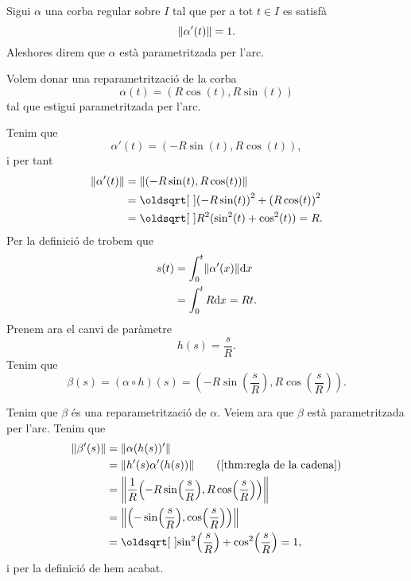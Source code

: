 \documentclass[../Apunts.tex]{subfiles}
\begin{document}
	\begin{definition}
		\label{def:corba parametritzada per l'arc}
		Sigui \(\alpha\) una corba regular sobre \(I\) tal que per a tot \(t\in I\) es satisfà
		\[\norm{\alpha'(t)}=1.\]
		Aleshores direm que \(\alpha\) està parametritzada per l'arc.
	\end{definition}
	\begin{example} %
		\label{ex:reparametrització per l'arc del cercle de radi R}
		\label{ex:circumferència de radi R parametritzat per l'arc}
		Volem donar una reparametrització de la corba
		\[\alpha(t)=(R\cos(t),R\sin(t))\]
		tal que estigui parametritzada per l'arc.
		\begin{solution}
			Tenim que
			\[\alpha'(t)=(-R\sin(t),R\cos(t)),\]
			i per tant
			\begin{align*}
				\norm{\alpha'(t)}&=\norm{(-R\sin(t),R\cos(t))} \\
				&=\sqrt{{(-R\sin(t))}^{2}+{(R\cos(t))}^{2}} \\
				&=\sqrt{R^{2}(\sin^{2}(t)+\cos^{2}(t))}=R.
			\end{align*}
			Per la definició de  trobem que
			\begin{align*}
				s(t)&=\int_{0}^{t}\norm{\alpha'(x)}\diff x \\
				&=\int_{0}^{t}R\diff x=Rt.
			\end{align*}
			Prenem ara el canvi de paràmetre
			\[h(s)=\frac{s}{R}.\]
			Tenim que
			\[\beta(s)=(\alpha\circ h)(s)=\left(-R\sin\left(\frac{s}{R}\right),R\cos\left(\frac{s}{R}\right)\right).\]
			
			Tenim que \(\beta\) és una reparametrització de \(\alpha\). Veiem ara que \(\beta\) està parametritzada per l'arc. Tenim que
			\begin{align*}
				\norm{\beta'(s)}&=\norm{\alpha(h(s))'} \\
				&=\norm{h'(s)\alpha'(h(s))} \tag{\ref{thm:regla de la cadena}}\\
				&=\norm{\frac{1}{R}\left(-R\sin\left(\frac{s}{R}\right),R\cos\left(\frac{s}{R}\right)\right)} \\
				&=\norm{\left(-\sin\left(\frac{s}{R}\right),\cos\left(\frac{s}{R}\right)\right)} \\
				&=\sqrt{\sin^{2}\left(\frac{s}{R}\right)+\cos^{2}\left(\frac{s}{R}\right)}=1,
			\end{align*}
			i per la definició de  hem acabat.
		\end{solution}
	\end{example}
\end{document}
